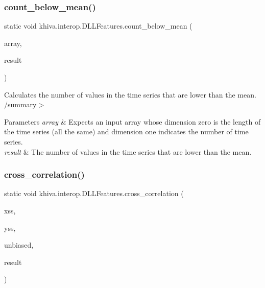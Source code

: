 \mbox{\label{classkhiva_1_1interop_1_1_d_l_l_features_a5559115107d672d504af9fec765278e8}} 
\subsubsection{\texorpdfstring{count\+\_\+below\+\_\+mean()}{count\_below\_mean()}}
{\footnotesize\ttfamily static void khiva.\+interop.\+D\+L\+L\+Features.\+count\+\_\+below\+\_\+mean (\begin{DoxyParamCaption}\item[{\mbox{[}\+In\mbox{]} ref Int\+Ptr}]{array,  }\item[{\mbox{[}\+Out\mbox{]} out Int\+Ptr}]{result }\end{DoxyParamCaption})\hspace{0.3cm}{\ttfamily [static]}}



Calculates the number of values in the time series that are lower than the mean. /summary$>$ 
\begin{DoxyParams}{Parameters}
{\em array} & Expects an input array whose dimension zero is the length of the time series (all the same) and dimension one indicates the number of time series.\\
\hline
{\em result} & The number of values in the time series that are lower than the mean.\\
\hline
\end{DoxyParams}


\mbox{\label{classkhiva_1_1interop_1_1_d_l_l_features_a857ec574d5fb5492b861efff45494932}} 
\subsubsection{\texorpdfstring{cross\+\_\+correlation()}{cross\_correlation()}}
{\footnotesize\ttfamily static void khiva.\+interop.\+D\+L\+L\+Features.\+cross\+\_\+correlation (\begin{DoxyParamCaption}\item[{\mbox{[}\+In\mbox{]} ref Int\+Ptr}]{xss,  }\item[{\mbox{[}\+In\mbox{]} ref Int\+Ptr}]{yss,  }\item[{\mbox{[}\+In\mbox{]} ref bool}]{unbiased,  }\item[{\mbox{[}\+Out\mbox{]} out Int\+Ptr}]{result }\end{DoxyParamCaption})\hspace{0.3cm}{\ttfamily [static]}}



